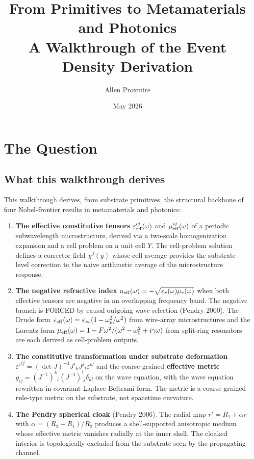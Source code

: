 \documentclass[11pt,a4paper]{article}
\title{\vspace{-1cm}\Large\bfseries From Primitives to Metamaterials and Photonics\\[6pt]
\large\mdseries A Walkthrough of the Event Density Derivation}
\author{Allen Proxmire}
\date{May 2026}
\begin{document}
\maketitle

\section{The Question}

\subsection{What this walkthrough derives}

This walkthrough derives, from substrate primitives, the structural backbone of four Nobel-frontier results in metamaterials and photonics:

\begin{enumerate}[noitemsep]
\item \textbf{The effective constitutive tensors} $\varepsilon_{\rm eff}^{ij}(\omega)$ and $\mu_{\rm eff}^{ij}(\omega)$ of a periodic subwavelength microstructure, derived via a two-scale homogenization expansion and a cell problem on a unit cell $Y$. The cell-problem solution defines a corrector field $\chi^j(y)$ whose cell average provides the substrate-level correction to the naive arithmetic average of the microstructure response.
\item \textbf{The negative refractive index} $n_{\rm eff}(\omega) = -\sqrt{\varepsilon_r(\omega)\mu_r(\omega)}$ when both effective tensors are negative in an overlapping frequency band. The negative branch is FORCED by causal outgoing-wave selection (Pendry 2000). The Drude form $\varepsilon_{\rm eff}(\omega) = \varepsilon_\infty(1 - \omega_p^2/\omega^2)$ from wire-array microstructures and the Lorentz form $\mu_{\rm eff}(\omega) = 1 - F\omega^2/(\omega^2 - \omega_0^2 + i\gamma\omega)$ from split-ring resonators are each derived as cell-problem outputs.
\item \textbf{The constitutive transformation under substrate deformation} $\varepsilon'^{ij} = (\det J)^{-1} J^i{}_k J^j{}_l \varepsilon^{kl}$ and the coarse-grained \textbf{effective metric} $g_{ij} = (J^{-1})^k{}_i (J^{-1})^l{}_j \delta_{kl}$ on the wave equation, with the wave equation rewritten in covariant Laplace-Beltrami form. The metric is a coarse-grained rule-type metric on the substrate, not spacetime curvature.
\item \textbf{The Pendry spherical cloak} (Pendry 2006). The radial map $r' = R_1 + \alpha r$ with $\alpha = (R_2 - R_1)/R_2$ produces a shell-supported anisotropic medium whose effective metric vanishes radially at the inner shell. The cloaked interior is topologically excluded from the substrate seen by the propagating channel.

\end{enumerate}
\end{document}
